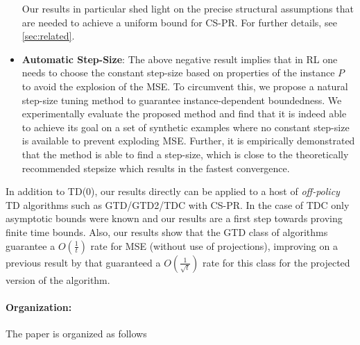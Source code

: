 \begin{itemize}[leftmargin=*]
Our results in particular shed light on the precise structural assumptions that are needed 
to achieve a uniform bound for CS-PR. 
For further details, see \cref{sec:related}.
\item \textbf{Automatic Step-Size}: 
The above negative result implies that in RL one needs to choose the constant step-size based on properties of the instance $P$ to avoid the explosion of the MSE.
To circumvent this, we propose a natural step-size tuning method to guarantee instance-dependent boundedness.
We experimentally evaluate the proposed method and find that it is indeed able to achieve its goal on a set of synthetic examples
where no constant step-size is available to prevent exploding MSE. Further, it is empirically demonstrated that the method is able to find a step-size, which is close to the theoretically recommended stepsize which results in the fastest convergence. 
\end{itemize}
In addition to TD($0$), our results directly can be applied to a host of \emph{off-policy} TD algorithms such as GTD/GTD2/TDC with CS-PR. 
In the case of TDC only asymptotic bounds were known \cite{gtd2} and our results are a first step 
 towards proving finite time bounds. Also, our results show that the GTD class of algorithms guarantee a $O(\frac{1}{t})$ rate for MSE (without use of projections), improving on a previous result by \citet{gtdmp} that guaranteed a $O(\frac{1}{\sqrt{t}})$ rate for this class for the projected version of the algorithm. 
\paragraph{Organization:} The paper is organized as follows 
